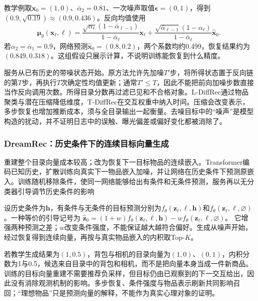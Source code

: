 教学例取$\bm x_0=(1,0)$、$\bar\alpha_2=0.81$、一次噪声取值$\bm\epsilon=(0,1)$，得到$(0.9,\sqrt{0.19})\approx(0.9,0.436)$。反向均值使用
\begin{equation}
 \bm\mu_\theta(\bm x_\ell,\ell)=
 \frac{\sqrt{\alpha_\ell}(1-\bar\alpha_{\ell-1})}{1-\bar\alpha_\ell}\bm x_\ell
 +\frac{\sqrt{\bar\alpha_{\ell-1}}(1-\alpha_\ell)}{1-\bar\alpha_\ell}
       \widehat{\bm x}_0.
 \label{eq:rs-diffrec-mean}
\end{equation}
若$\alpha_2=\bar\alpha_1=0.9$，网络预测$\widehat{\bm x}_0=(0.8,0.2)$，两个系数均约0.499，恢复结果约为$(0.849,0.318)$。这组假设只展示计算，不说明训练能恢复到什么精度。

服务从已有历史的带噪状态开始。原方法允许先加噪$T'$步，将所得状态置于反向链的第$T$步，再执行$T$次确定性均值更新；通常$T'\le T$，因此不能把前向加噪步数直接当作反向调用次数。所得目录分数再过滤已见和不合格对象。L-DiffRec通过物品聚类与潜在压缩降低维度，T-DiffRec在交互权重中纳入时间。压缩会改变表示，多步恢复也增加推断成本，须与全目录输出一起衡量。去噪目标中的“噪声”是模型构造的扰动，并不证明日志中的误触、曝光偏差或偏好变化都被消除了。

\Needspace{90mm}
\subsubsection{DreamRec：历史条件下的连续目标向量生成}
\label{sec:rs-dreamrec}

重建整个目录向量成本较高；改为恢复下一目标物品的连续嵌入。Transformer编码已知历史，扩散训练向真实下一物品嵌入加噪，并让网络在历史条件下预测原嵌入。训练随机移除条件，使同一网络能够给出有条件和无条件预测，服务再以无分类器引导调节历史条件的影响

设历史条件为$\bm h$，有条件与无条件的目标预测分别为$f_\theta(\bm z_\ell,\ell,\bm h)$和$f_\theta(\bm z_\ell,\ell,\varnothing)$。一种等价的引导记号为
$\widehat{\bm z}_0=(1+w)f_\theta(\bm z_\ell,\ell,\bm h)-w f_\theta(\bm z_\ell,\ell,\varnothing)$。
它增强两种预测之差；$w$改变条件强度，不能保证越大越符合偏好。生成从噪声开始，经过恢复得到连续向量，再按与真实物品嵌入的内积取Top-$K$。

若教学生成结果为$(1,0.5)$，背包与相机的目录向量为$(1,0)$、$(0,1)$，内积分数为1与0.5，候选来自目录中的背包和相机，而不是把向量本身当成一件新商品。训练的目标向量重建不需要推荐负采样，但目标仍由已观察到的下一交互给出，因此没有消除观测机制的影响。多步恢复、条件强度与物品表示刷新共同影响召回；“理想物品”只是预测向量的解释，不能作为真实心理对象的证明。

